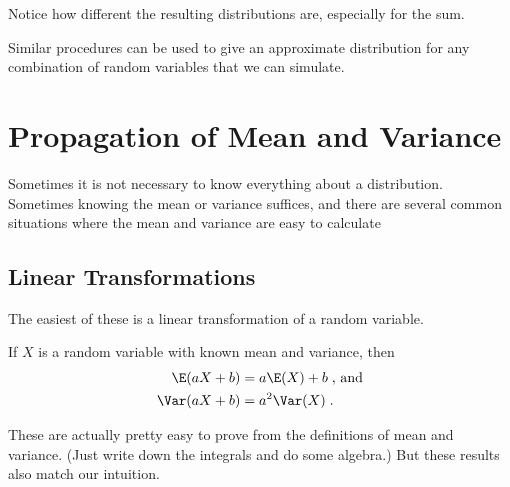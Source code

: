 \documentclass[twoside]{book}\usepackage[]{graphicx}\usepackage[]{xcolor}
\newenvironment{knitrout}{}{} %
\newlength{\tempfmlength}
\newenvironment{fmpage}[1]
     {
	 \medskip
	 \setlength{\tempfmlength}{#1}
	 \begin{lrbox}{\fmbox}
	   \begin{minipage}{#1}
		 \vspace*{.02\tempfmlength}
		 \hfill
	   \begin{minipage}{.95 \tempfmlength}}
		 {\end{minipage}\hfill
		 \vspace*{.015\tempfmlength}
		 \end{minipage}\end{lrbox}\fbox{\usebox{\fmbox}}
	 \medskip
	 }
\newenvironment{boxedText}[1][.98\textwidth]%
{%
\begin{center}
\begin{fmpage}{#1}
}%
{%
\end{fmpage}
\end{center}
}
\begin{document}
\begin{knitrout}
{}



\end{knitrout}
Notice how different the resulting distributions are, especially for the sum.

Similar procedures can be used to give an approximate distribution for any combination
of random variables that we can simulate.

\section{Propagation of Mean and Variance}

Sometimes it is not necessary to know everything about a distribution.  Sometimes knowing 
the mean or variance suffices, and there are several common situations where the mean
and variance are easy to calculate

\subsection{Linear Transformations}
The easiest of these is a linear transformation of a random variable.  

\begin{boxedText}
If $X$ is a random variable with known mean and variance, then 
\begin{align*}
	\E(a X + b) &= a \E(X) + b \; \mbox{, and}
	\\
		\Var(a X + b) &= a^2 \Var (X) \; .
\end{align*}
\end{boxedText}

These are actually pretty easy to prove from the definitions of mean and variance.  (Just 
write down the integrals and do some algebra.)  But these results also match our 
intuition.
\end{document}
